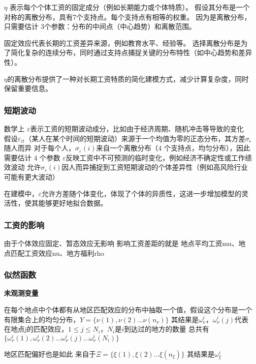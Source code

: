 \documentclass[a4paper,10pt]{article}
\begin{document}
$\eta$ 表示每个个体工资的固定成分（例如长期能力或个体特质）。
假设其分布是一个对称的离散分布，具有7个支持点。每个支持点有相等的权重。
因为是离散分布，只需要估计 3个参数：分布的中间点（中心趋势）和离散范围。

固定效应代表长期的工资差异来源，例如教育水平、经验等。
选择离散分布是为了简化复杂的连续分布，同时通过支持点捕捉关键的分布特性（如中心趋势和差异性）。

$\eta$的离散分布提供了一种对长期工资特质的简化建模方式，减少计算复杂度，同时保留重要信息。

\subsubsection{短期波动}

数学上
$\varepsilon$表示工资的短期波动成分，比如由于经济周期、随机冲击等导致的变化
假设$\varepsilon_{it}$（某人在某个时间的短期波动）来源于一个均值为零的正态分布，其方差$\sigma_{\epsilon}$随人而异
对于每个人，$\sigma_\varepsilon(i)$来自一个离散分布（4 个支持点，均匀分布），因此需要估计 4 个参数
$\varepsilon$反映工资中不可预测的临时变化，例如经济不确定性或工作绩效波动
允许$\sigma_\varepsilon(i)$因人而异捕捉到工资短期波动的个体差异性（例如高风险行业可能有更大波动）


在建模中，$\varepsilon$允许方差随个体变化，体现了个体的异质性，这进一步增加模型的灵活性，使其能够更好地拟合数据。

\subsubsection{工资的影响}

由于个体效应固定、暂态效应无影响
影响工资差距的就是
地点平均工资mu、地点匹配工资效应nu、地方福利rho

\subsubsection{似然函数}

\textbf{未观测变量}

在每个地点中个体都有从地区匹配效应的分布中抽取一个值，假设这个分布是一个有限集合上的均匀分布，$Y=\{\nu(1),\nu(2)...\nu(n_{\nu})\}$
其结果是$\omega^{i}_{\nu}$，$\omega^{i}_{\nu}(j)$代表在地点j的匹配效应，$1\leqslant j\leqslant N_i$，$N_i$是$i$到达过的地方的数量
总共有$\{\omega^{i}_{\nu}(1),\omega^{i}_{\nu}(2)...\omega^{i}_{\nu}(j)...\omega^{i}_{\nu}(N_i)\}$

地区匹配偏好也是如此
来自于$\Xi=\{\xi(1),\xi(2)...\xi(n_{\xi})\}$
其结果是$\omega^{i}_{\xi}$
\end{document}
